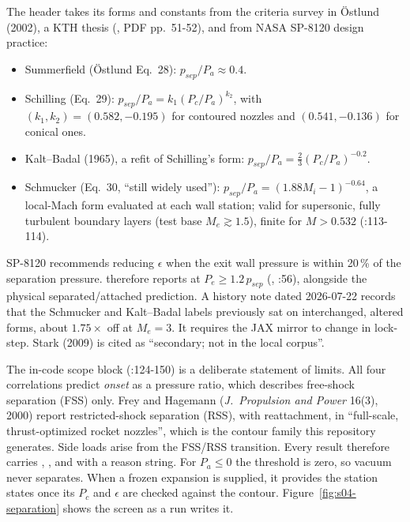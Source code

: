 The header takes its forms and constants from the criteria survey in Östlund (2002), a KTH thesis (, PDF pp.\ 51-52), and from NASA SP-8120 design practice:
\begin{itemize}
\item Summerfield (Östlund Eq.\ 28): $p_{sep}/P_a\approx 0.4$.
\item Schilling (Eq.\ 29): $p_{sep}/P_a=k_1(P_c/P_a)^{k_2}$, with $(k_1,k_2)=(0.582,-0.195)$ for contoured nozzles and $(0.541,-0.136)$ for conical ones.
\item Kalt--Badal (1965), a refit of Schilling's form: $p_{sep}/P_a=\tfrac23(P_c/P_a)^{-0.2}$.
\item Schmucker (Eq.\ 30, ``still widely used''): $p_{sep}/P_a=(1.88M_i-1)^{-0.64}$, a local-Mach form evaluated at each wall station; valid for supersonic, fully turbulent boundary layers (test base $M_e \gtrsim 1.5$), finite for $M>0.532$ (:113-114).
\end{itemize}

SP-8120 recommends reducing $\epsilon$ when the exit wall pressure is within 20\,\% of the separation pressure.  therefore reports  at $P_e\ge 1.2\,p_{sep}$ (, :56), alongside the physical separated/attached prediction. A history note dated 2026-07-22 records that the Schmucker and Kalt--Badal labels previously sat on interchanged, altered forms, about $1.75\times$ off at $M_e=3$. It requires the JAX mirror  to change in lock-step. Stark (2009) is cited as ``secondary; not in the local corpus''.

The in-code scope block (:124-150) is a deliberate statement of limits. All four correlations predict \emph{onset} as a pressure ratio, which describes free-shock separation (FSS) only. Frey and Hagemann (\emph{J.\ Propulsion and Power} 16(3), 2000) report restricted-shock separation (RSS), with reattachment, in ``full-scale, thrust-optimized rocket nozzles'', which is the contour family this repository generates. Side loads arise from the FSS/RSS transition. Every result therefore carries , , and  with a reason string. For $P_a\le 0$ the threshold is zero, so vacuum never separates. When a frozen expansion is supplied, it provides the station states once its $P_c$ and $\epsilon$ are checked against the contour. Figure~\ref{fig:s04-separation} shows the screen as a run writes it.

